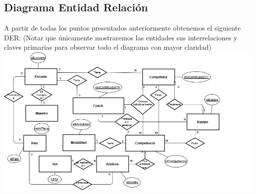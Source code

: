 \subsection{Diagrama Entidad Relaci\'on}

A partir de todas los puntos presentados anteriormente obtenemos el siguiente DER: (Notar que únicamente mostraremos las entidades sus interrelaciones y claves primarias para observar todo el diagrama con mayor claridad)\\

\includegraphics[scale=0.55]{der.jpg}